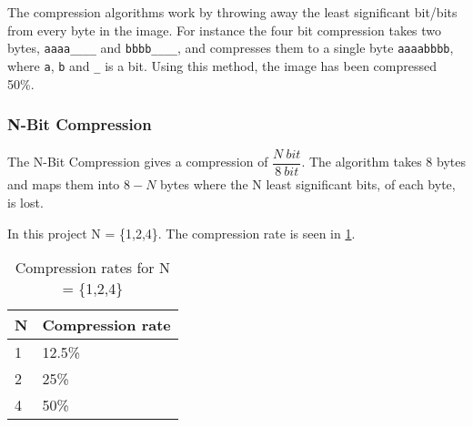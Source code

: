 The compression algorithms work by throwing away the least significant bit/bits from every byte in the image.
For instance the four bit compression takes two bytes, \texttt{aaaa\_\_\_\_} and \texttt{bbbb\_\_\_\_}, and compresses them to a single byte \texttt{aaaabbbb}, where \texttt{a}, \texttt{b} and \texttt{\_} is a bit. Using this method, the image has been compressed 50\%.


\subsubsection{N-Bit Compression} %
\label{sub:one_bit_compression}

The N-Bit Compression gives a compression of $\dfrac{N\ bit}{8\ bit}$.
The algorithm takes 8 bytes and maps them into $8-N$ bytes where the N least significant bits, of each byte, is lost.

In this project N = \{1,2,4\}. The compression rate is seen in \ref{tab:compressionrate}.
\begin{table}[H]
	\centering
	\begin{tabular}{ll}
	\hline
		N & Compression rate \\ \hline
		1 & 12.5\% \\ 
		2 & 25\% \\ 
		4 & 50\% \\ \hline
	\end{tabular}
	\caption{Compression rates for N = \{1,2,4\}}
	\label{tab:compressionrate}
\end{table}




